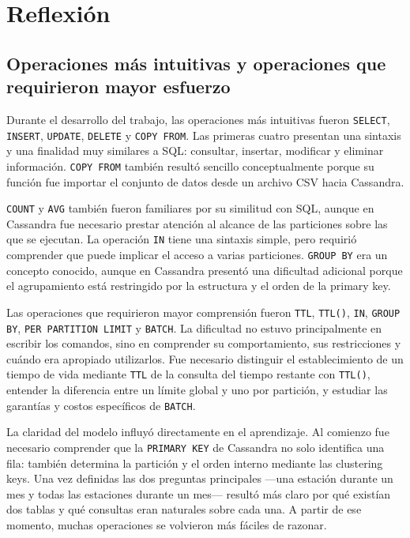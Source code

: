 \section{Reflexión}

\subsection{Operaciones más intuitivas y operaciones que requirieron mayor esfuerzo}

Durante el desarrollo del trabajo, las operaciones más intuitivas fueron \texttt{SELECT}, \texttt{INSERT}, \texttt{UPDATE}, \texttt{DELETE} y \texttt{COPY FROM}. Las primeras cuatro presentan una sintaxis y una finalidad muy similares a SQL: consultar, insertar, modificar y eliminar información. \texttt{COPY FROM} también resultó sencillo conceptualmente porque su función fue importar el conjunto de datos desde un archivo CSV hacia Cassandra.

\texttt{COUNT} y \texttt{AVG} también fueron familiares por su similitud con SQL, aunque en Cassandra fue necesario prestar atención al alcance de las particiones sobre las que se ejecutan. La operación \texttt{IN} tiene una sintaxis simple, pero requirió comprender que puede implicar el acceso a varias particiones. \texttt{GROUP BY} era un concepto conocido, aunque en Cassandra presentó una dificultad adicional porque el agrupamiento está restringido por la estructura y el orden de la primary key. \parencite{cassandra_dml}

Las operaciones que requirieron mayor comprensión fueron \texttt{TTL}, \texttt{TTL()}, \texttt{IN}, \texttt{GROUP BY}, \texttt{PER PARTITION LIMIT} y \texttt{BATCH}. La dificultad no estuvo principalmente en escribir los comandos, sino en comprender su comportamiento, sus restricciones y cuándo era apropiado utilizarlos. Fue necesario distinguir el establecimiento de un tiempo de vida mediante \texttt{TTL} de la consulta del tiempo restante con \texttt{TTL()}, entender la diferencia entre un límite global y uno por partición, y estudiar las garantías y costos específicos de \texttt{BATCH}.

La claridad del modelo influyó directamente en el aprendizaje. Al comienzo fue necesario comprender que la \texttt{PRIMARY KEY} de Cassandra no solo identifica una fila: también determina la partición y el orden interno mediante las clustering keys. Una vez definidas las dos preguntas principales ---una estación durante un mes y todas las estaciones durante un mes--- resultó más claro por qué existían dos tablas y qué consultas eran naturales sobre cada una. A partir de ese momento, muchas operaciones se volvieron más fáciles de razonar.

